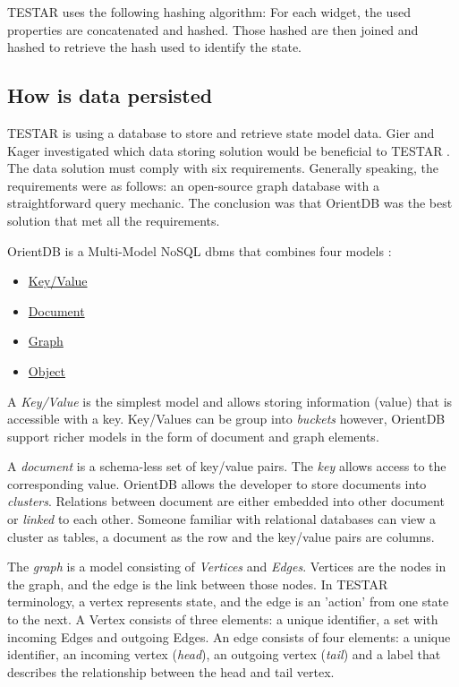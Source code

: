 TESTAR uses the following hashing algorithm: For each widget, the used properties are concatenated and hashed. Those hashed are then joined and hashed to retrieve the hash used to identify the state.

\subsection{How is data persisted}

TESTAR is using a database to store and retrieve state model data. Gier and Kager investigated which data storing solution would be beneficial to TESTAR \cite{GierKager}. The data solution must comply with six requirements. Generally speaking, the requirements were as follows: an open-source graph database with a straightforward query mechanic. The conclusion was that OrientDB was the best solution that met all the requirements.

OrientDB is a Multi-Model NoSQL \acrfull{dbms} that combines four models \cite{orientDbModeling}:

\begin{itemize}
    \item \hyperlink{db:key-value}{Key/Value}
    \item \hyperlink{db:document}{Document}
    \item \hyperlink{db:graph}{Graph}
    \item \hyperlink{db:object}{Object}
\end{itemize}

A \hypertarget{db:key-value}{\emph{Key/Value}} is the simplest model and allows storing information (value) that is accessible with a key. Key/Values can be group into \textit{buckets} however, OrientDB support richer models in the form of document and graph elements.

A \hypertarget{db:document}{\emph{document}} is a schema-less set of key/value pairs. The \emph{key} allows access to the corresponding value. OrientDB allows the developer to store documents into \emph{clusters}. Relations between document are either embedded into other document or \emph{linked} to each other. Someone familiar with relational databases can view a cluster as tables, a document as the row and the key/value pairs are columns.

The \hypertarget{db:graph}{\emph{graph}} is a model consisting of \emph{Vertices} and \emph{Edges}. Vertices are the nodes in the graph, and the edge is the link between those nodes. In TESTAR terminology, a vertex represents state, and the edge is an 'action' from one state to the next. A Vertex consists of three elements: a unique identifier, a set with incoming Edges and outgoing Edges. An edge consists of four elements: a unique identifier, an incoming vertex (\emph{head}), an outgoing vertex (\emph{tail}) and a label that describes the relationship between the head and tail vertex.\par

